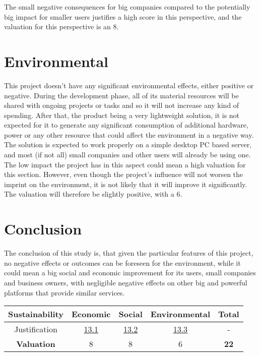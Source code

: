 The small negative consequences for big companies compared to the potentially big impact for smaller users justifies a high score in this perspective, and the valuation for this perspective is an 8.

\section{Environmental}
\label{sec:133}
This project doesn’t have any significant environmental effects, either positive or negative. During the development phase, all of its material resources will be shared with ongoing projects or tasks and so it will not increase any kind of spending. After that, the product being a very lightweight solution, it is not expected for it to generate any significant consumption of additional hardware, power or any other resource that could affect the environment in a negative way. The solution is expected to work properly on a simple desktop PC based server, and most (if not all) small companies and other users will already be using one. The low impact the project has in this aspect could mean a high valuation for this section. However, even though the project’s influence will not worsen the imprint on the environment, it is not likely that it will improve it significantly. The valuation will therefore be slightly positive, with a 6.

\section{Conclusion}
The conclusion of this study is, that given the particular features of this project, no negative effects or outcomes can be foreseen for the environment, while it could mean a big social and economic improvement for its users, small companies and business owners, with negligible negative effects on other big and powerful platforms that provide similar services.
\hfill\break
\begin{center}
    \begin{tabular}{ | c | c | c | c | c |}
    	\hline
 		\textbf{Sustainability} & Economic & Social & Environmental & \textbf{Total} \\ \hline
 		Justification & \hyperref[sec:131]{13.1} & \hyperref[sec:132]{13.2} & \hyperref[sec:133]{13.3} & - \\ \hline
 		\textbf{Valuation} & 8 & 8 & 6 & \textbf{22} \\ \hline
    \end{tabular}
\end{center}